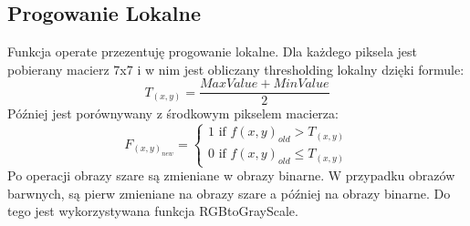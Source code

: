 \documentclass{article}
\begin{document}
\FloatBarrier
\subsection{Progowanie Lokalne}
Funkcja operate przezentuję progowanie lokalne. Dla każdego piksela jest pobierany macierz 7x7 i w nim jest obliczany thresholding lokalny dzięki formule:
\begin{equation*}
T_(x,y) =  \frac{MaxValue + MinValue}{2}
\end{equation*}
Później jest porównywany z środkowym pikselem macierza:
\begin{equation*}
F_(x,y)_{new} =  \begin{cases}1 \mbox{ if } f(x,y)_{old} > T_(x,y) \\ 0 \mbox{ if } f(x,y)_{old} \leq T_(x,y)\end{cases}
\end{equation*}
Po operacji obrazy szare są zmieniane w obrazy binarne. W przypadku obrazów barwnych, są pierw zmieniane na obrazy szare a później na obrazy binarne. Do tego jest wykorzystywana funkcja RGBtoGrayScale. \\
\end{document}

